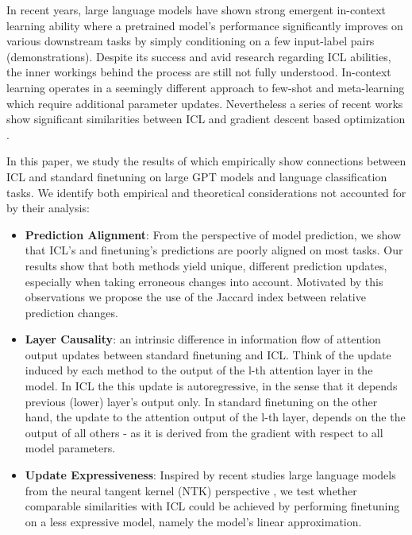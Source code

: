 In recent years, large language models \cite{brown20gpt3} have shown strong emergent in-context learning ability \cite{wei2022emergent} where a pretrained model's performance significantly improves on various downstream tasks by simply conditioning on a few input-label pairs (demonstrations).
Despite its success and avid research regarding ICL abilities, the inner workings behind the process are still not fully understood.
In-context learning operates in a seemingly different approach to few-shot and meta-learning which require additional parameter updates.
Nevertheless a series of recent works show significant similarities between ICL and gradient descent based optimization \cite{irie22dual, pmlr-v202-von-oswald23a, akyürek2023learning}.  

In this paper, we study the results of \cite{dai2023gpt} which empirically show connections between ICL and standard finetuning on large GPT models and language classification tasks.
We identify both empirical and theoretical considerations not accounted for by their analysis:
\begin{itemize}
    \item \textbf{Prediction Alignment}: From the perspective of model prediction, we show that ICL's and finetuning's predictions are poorly aligned on most tasks. 
    Our results show that both methods yield unique, different prediction updates, especially when taking erroneous changes into account.
    Motivated by this observations we propose the use of the Jaccard index between relative prediction changes.    

    \item \textbf{Layer Causality}: an intrinsic difference in information flow of attention output updates between standard finetuning and ICL.
    Think of the update induced by each method to the output of the l-th attention layer in the model.
    In ICL the this update is autoregressive, in the sense that it depends previous (lower) layer's output only.
    In standard finetuning on the other hand, the update to the attention output of the l-th layer, depends on the the output of all others - as it is derived from the gradient with respect to all model parameters.   
    
    \item \textbf{Update Expressiveness}: Inspired by recent studies large language models from the neural tangent kernel (NTK) perspective \cite{linearization23},
    we test whether comparable similarities with ICL could be achieved by performing finetuning on a less expressive model, namely the model's linear approximation.
\end{itemize}
